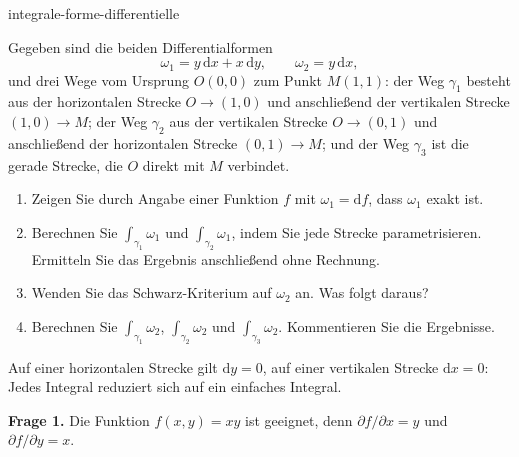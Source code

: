 
\begin{exo}{integrale-forme-differentielle}

Gegeben sind die beiden Differentialformen
\[
\omega_1 = y\,\mathrm{d}x + x\,\mathrm{d}y,
\qquad
\omega_2 = y\,\mathrm{d}x,
\]
und drei Wege vom Ursprung $O(0,0)$ zum Punkt $M(1,1)$: der Weg $\gamma_1$
besteht aus der horizontalen Strecke $O\to(1,0)$ und anschließend der vertikalen
Strecke $(1,0)\to M$; der Weg $\gamma_2$ aus der vertikalen Strecke
$O\to(0,1)$ und anschließend der horizontalen Strecke $(0,1)\to M$; und der
Weg $\gamma_3$ ist die gerade Strecke, die $O$ direkt mit $M$ verbindet.

\begin{enumerate}
\item Zeigen Sie durch Angabe einer Funktion $f$ mit $\omega_1=\mathrm{d}f$, dass $\omega_1$ exakt ist.
\item Berechnen Sie $\int_{\gamma_1}\omega_1$ und $\int_{\gamma_2}\omega_1$, indem Sie jede Strecke parametrisieren. Ermitteln Sie das Ergebnis anschließend ohne Rechnung.
\item Wenden Sie das Schwarz-Kriterium auf $\omega_2$ an. Was folgt daraus?
\item Berechnen Sie $\int_{\gamma_1}\omega_2$, $\int_{\gamma_2}\omega_2$ und $\int_{\gamma_3}\omega_2$. Kommentieren Sie die Ergebnisse.
\end{enumerate}

\begin{indication}
Auf einer horizontalen Strecke gilt $\mathrm{d}y=0$, auf einer vertikalen
Strecke $\mathrm{d}x=0$: Jedes Integral reduziert sich auf ein einfaches Integral.
\end{indication}

\begin{solution}
\textbf{Frage 1.} Die Funktion $f(x,y)=xy$ ist geeignet, denn $\partial f/\partial x=y$ und $\partial f/\partial y=x$.


\end{solution}
\end{exo}
